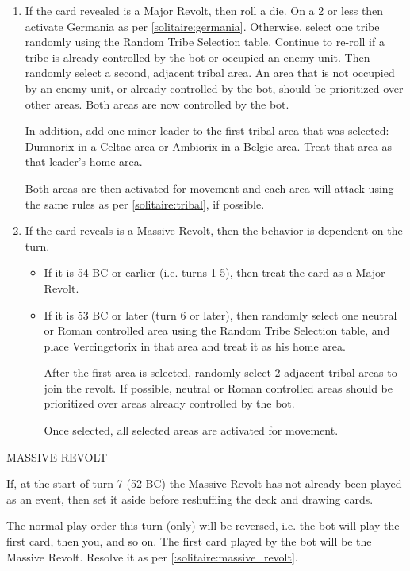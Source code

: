\begin{enumerate}
\begin{enumerate}[leftmargin=0in]
    \item If the card revealed is a Major Revolt, then roll a die. On a 2 or less then activate Germania as per \ref{solitaire:germania}. Otherwise, select one tribe randomly using the Random Tribe Selection table. Continue to re-roll if a tribe is already controlled by the bot or occupied an enemy unit. Then randomly select a second, adjacent tribal area. An area that is not occupied by an enemy unit, or already controlled by the bot, should be prioritized over other areas. Both areas are now controlled by the bot.
  
    In addition, add one minor leader to the first tribal area that was selected: Dumnorix in a Celtae area or Ambiorix in a Belgic area. Treat that area as that leader's home area.
  
    Both areas are then activated for movement and each area will attack using the same rules as per \ref{solitaire:tribal}, if possible.
  
    \item If the card reveals is a Massive Revolt, then the behavior is dependent on the turn.
    \begin{itemize}
      \item If it is 54 BC or earlier (i.e. turns 1-5), then treat the card as a Major Revolt.
      \item \label{:solitaire:massive_revolt}If it is 53 BC or later (turn 6 or later), then randomly select one neutral or Roman controlled area using the Random Tribe Selection table, and place Vercingetorix in that area and treat it as his home area.
      
      After the first area is selected, randomly select 2 adjacent tribal areas to join the revolt. If possible, neutral or Roman controlled areas should be prioritized over areas already controlled by the bot.
      
      Once selected, all selected areas are activated for movement.
    \end{itemize}
  \end{enumerate}
\end{enumerate}
  
MASSIVE REVOLT

If, at the start of turn 7 (52 BC) the Massive Revolt has not already been played as an event, then set it aside before reshuffling the deck and drawing cards.
  
The normal play order this turn (only) will be reversed, i.e. the bot will play the first card, then you, and so on. The first card played by the bot will be the Massive Revolt. Resolve it as per \ref{:solitaire:massive_revolt}.
  
